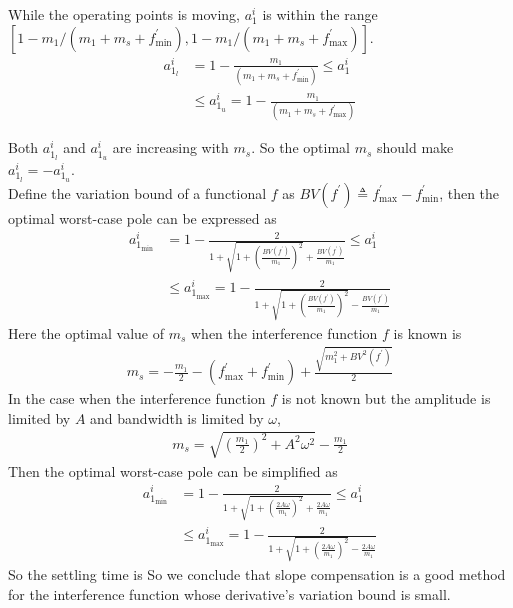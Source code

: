 While the operating points is moving, $a^{i}_1$ is within the range
 $ [1 - m_1/(m_1 + m_s + f^{'}_{\text{min}}), 1-m_1/(m_1 + m_s + f^{'}_{\text{max}})]$. 
\begin{align}
a^i_{1_l} &= 1 - \frac{m_1}{(m_1 + m_s + f^{'}_{\text{min}})} \le a^i_1 \nonumber \\
&\le   a^i_{1_u} = 1 - \frac{m_1}{(m_1 + m_s + f^{'}_{\text{max}})}
\end{align}

Both $a^i_{1_l}$ and $a^i_{1_u}$ are increasing with $m_s$. So the optimal $m_s$ should make $a^i_{1_l} = -a^i_{1_u}$.\\
Define the variation bound of a functional $f$ as $BV(f^{'}) \triangleq f^{'}_{\text{max}}-f^{'}_{\text{min}}$, then the optimal worst-case pole can be expressed as
\begin{align}
a^i_{1_{\text{min}}} &= 1 - \frac{2}{1 + \sqrt{1+\left(\frac{BV(f^{'})}{m_1}\right)^2} + \frac{BV(f^{'})}{m_1}} \le a^i_1 \nonumber \\
&\le a^i_{1_{\text{max}}} = 1 - \frac{2}{1 + \sqrt{1+\left(\frac{BV(f^{'})}{m_1}\right)^2} -\frac{BV(f^{'})}{m_1}}
\end{align}
Here the optimal value of $m_s$ when the interference function $f$ is known is 
\begin{align}
    m_s = -\frac{m_1}{2} - (f^{'}_{\text{max}}+f^{'}_{\text{min}}) + \frac{\sqrt{m_1^2+BV^2(f^{'})}}{2}
\end{align}
In the case when the interference function $f$ is not known but the amplitude is limited by $A$ and bandwidth is limited by $\omega$, 
\begin{align}
    m_s = \sqrt{\left(\frac{m_1}{2}\right)^2+A^2\omega^2} -\frac{m_1}{2} 
\end{align}
Then the optimal worst-case pole can be simplified as
\begin{align}
a^i_{1_{\text{min}}} &= 1 - \frac{2}{1 + \sqrt{1+\left(\frac{2A\omega}{m_1}\right)^2} + \frac{2A\omega}{m_1}} \le a^i_1 \nonumber \\
&\le a^i_{1_{\text{max}}} = 1 - \frac{2}{1 + \sqrt{1+\left(\frac{2A\omega}{m_1}\right)^2} -\frac{2A\omega}{m_1}}
\end{align}
So the settling time is
So we conclude that slope compensation is a good method for the interference function whose derivative's variation bound is small.

